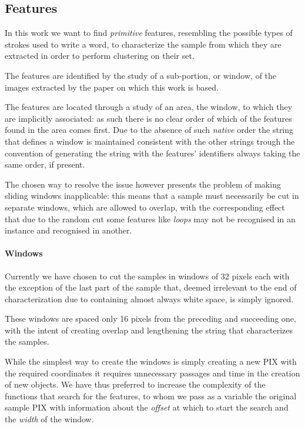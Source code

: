 \subsection{Features}



In this work we want to find \emph{primitive} features, resembling the possible types of strokes used to write a word, to characterize the sample from which they are extracted in order to perform clustering on their set.

The features are identified by the study of a sub-portion, or window, of the images extracted by the paper on which this work is based.

The features are located through a study of an area, the window, to which they are implicitly associated: as such there is no clear order of which of the features found in the area comes first.
Due to the absence of such \emph{native} order the string that defines a window is maintained consistent with the other strings trough the convention of generating the string with the features' identifiers always taking the same order, if present.

The chosen way to resolve the issue however presents the problem of making sliding windows inapplicable: this means that a sample must necessarily be cut in separate windows, which are allowed to overlap, with the corresponding effect that due to the random cut some features like \textit{loops} may not be recognised in an instance and recognised in another. 

\paragraph{Windows}

Currently we have chosen to cut the samples in windows of 32 pixels each with the exception of the last part of the sample that, deemed irrelevant to the end of characterization due to containing almost always white space, is simply ignored.

These windows are spaced only 16 pixels from the preceding and succeeding one, with the intent of creating overlap and lengthening the string that characterizes the samples.

While the simplest way to create the windows is simply creating a new PIX with the required coordinates it requires unnecessary passages and time in the creation of new objects. We have thus preferred to increase the complexity of the functions that search for the features, to whom we pass as a variable the original sample PIX with information about the \textit{offset} at which to start the search and the \textit{width} of the window.

